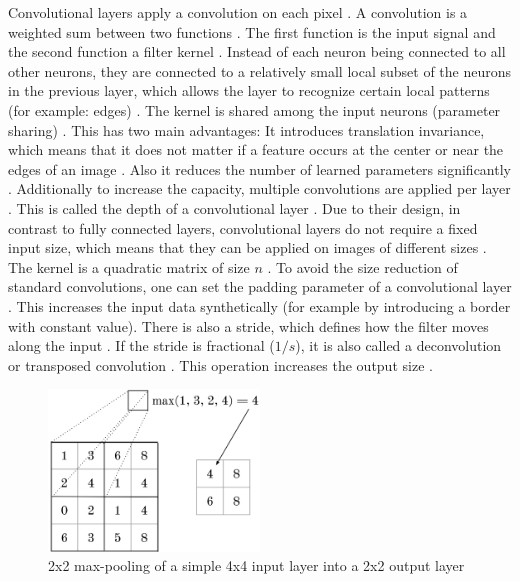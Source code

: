 \documentclass[draft,final,oneside]{vutinfth} %
\begin{document}
Convolutional layers apply a convolution on each pixel \cite{bishop}. A convolution is a weighted sum between two functions \cite{Goodfellow-et-al-2016}. The first function is the input signal and the second function a filter kernel \cite{bishop}. Instead of each neuron being connected to all other neurons, they are connected to a relatively small local subset of the neurons in the previous layer, which allows the layer to recognize certain local patterns (for example: edges) \cite{Goodfellow-et-al-2016}. The kernel is shared among the input neurons (parameter sharing) \cite{bishop}. This has two main advantages: It introduces translation invariance, which means that it does not matter if a feature occurs at the center or near the edges of an image \cite{Goodfellow-et-al-2016}. Also it reduces the number of learned parameters significantly \cite{bishop}. Additionally to increase the capacity, multiple convolutions are applied per layer \cite{Goodfellow-et-al-2016}. This is called the depth of a convolutional layer \cite{Goodfellow-et-al-2016}. Due to their design, in contrast to fully connected layers, convolutional layers do not require a fixed input size, which means that they can be applied on images of different sizes \cite{dlvc}. The kernel is a quadratic matrix of size $n$ \cite{alexnet}. To avoid the size reduction of standard convolutions, one can set the padding parameter of a convolutional layer \cite{Goodfellow-et-al-2016}. This increases the input data synthetically (for example by introducing a border with constant value). There is also a stride, which defines how the filter moves along the input \cite{Goodfellow-et-al-2016}. If the stride is fractional ($1/s$), it is also called a deconvolution or transposed convolution \cite{dlvc}. This operation increases the output size \cite{Goodfellow-et-al-2016}.


\begin{figure}[ht]
	\centering
  	\includegraphics[width=0.5\textwidth]{graphics/maxpooling.png}
	\caption{2x2 max-pooling of a simple 4x4 input layer into a 2x2 output layer}
	\label{fig:maxpooling}
\end{figure}
\end{document}
